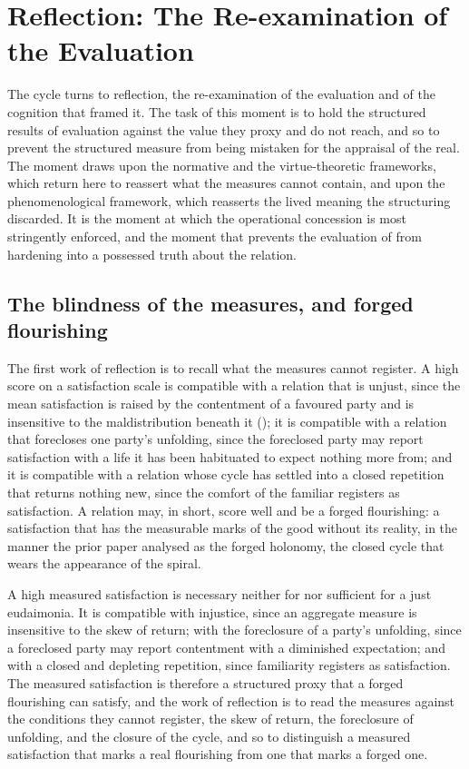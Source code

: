 \section{Reflection: The Re-examination of the Evaluation}
\label{p11:sec:reflection}

\noindent
The cycle turns to reflection, the re-examination of the evaluation and of the cognition that framed it. The task of this moment is to hold the structured results of evaluation against the value they proxy and do not reach, and so to prevent the structured measure from being mistaken for the appraisal of the real. The moment draws upon the normative and the virtue-theoretic frameworks, which return here to reassert what the measures cannot contain, and upon the phenomenological framework, which reasserts the lived meaning the structuring discarded. It is the moment at which the operational concession is most stringently enforced, and the moment that prevents the evaluation of  from hardening into a possessed truth about the relation.

\subsection{The blindness of the measures, and forged flourishing}
\label{p11:sec:ref-blind}

The first work of reflection is to recall what the measures cannot register. A high score on a satisfaction scale is compatible with a relation that is unjust, since the mean satisfaction is raised by the contentment of a favoured party and is insensitive to the maldistribution beneath it (); it is compatible with a relation that forecloses one party's unfolding, since the foreclosed party may report satisfaction with a life it has been habituated to expect nothing more from; and it is compatible with a relation whose cycle has settled into a closed repetition that returns nothing new, since the comfort of the familiar registers as satisfaction. A relation may, in short, score well and be a forged flourishing: a satisfaction that has the measurable marks of the good without its reality, in the manner the prior paper analysed as the forged holonomy, the closed cycle that wears the appearance of the spiral.

\begin{claim}
A high measured satisfaction is necessary neither for nor sufficient for a just eudaimonia. It is compatible with injustice, since an aggregate measure is insensitive to the skew of return; with the foreclosure of a party's unfolding, since a foreclosed party may report contentment with a diminished expectation; and with a closed and depleting repetition, since familiarity registers as satisfaction. The measured satisfaction is therefore a structured proxy that a forged flourishing can satisfy, and the work of reflection is to read the measures against the conditions they cannot register, the skew of return, the foreclosure of unfolding, and the closure of the cycle, and so to distinguish a measured satisfaction that marks a real flourishing from one that marks a forged one.
\end{claim}

